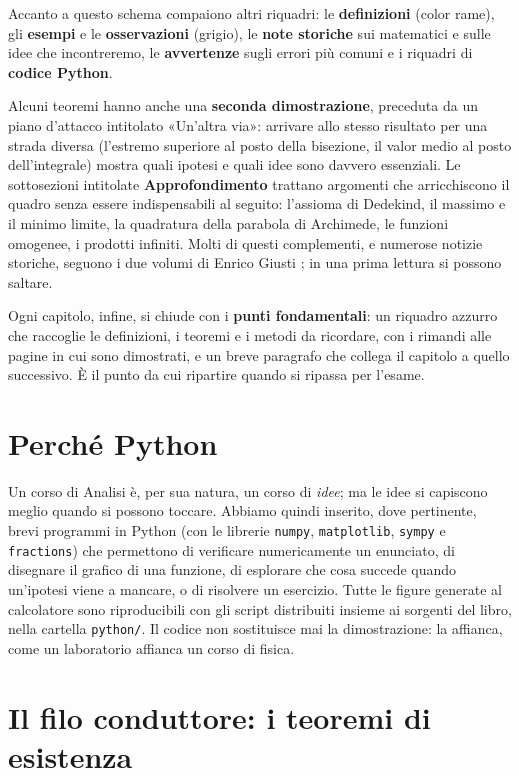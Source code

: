 Accanto a questo schema compaiono altri riquadri: le \textbf{definizioni} (color rame),
gli \textbf{esempi} e le \textbf{osservazioni} (grigio), le \textbf{note storiche} sui
matematici e sulle idee che incontreremo, le \textbf{avvertenze} sugli errori più comuni
e i riquadri di \textbf{codice Python}.

Alcuni teoremi hanno anche una \textbf{seconda dimostrazione}, preceduta da un piano
d'attacco intitolato «Un'altra via»: arrivare allo stesso risultato per una strada
diversa (l'estremo superiore al posto della bisezione, il valor medio al posto
dell'integrale) mostra quali ipotesi e quali idee sono davvero essenziali. Le
sottosezioni intitolate \textbf{Approfondimento} trattano argomenti che arricchiscono
il quadro senza essere indispensabili al seguito: l'assioma di Dedekind, il massimo e il
minimo limite, la quadratura della parabola di Archimede, le funzioni omogenee, i
prodotti infiniti. Molti di questi complementi, e numerose notizie storiche, seguono i
due volumi di Enrico Giusti \cite{giusti,giusti2}; in una prima lettura si possono
saltare.

Ogni capitolo, infine, si chiude con i
\textbf{punti fondamentali}: un riquadro azzurro che raccoglie le definizioni, i teoremi
e i metodi da ricordare, con i rimandi alle pagine in cui sono dimostrati, e un breve
paragrafo che collega il capitolo a quello successivo. È il punto da cui ripartire
quando si ripassa per l'esame.

\section*{Perché Python}

Un corso di Analisi è, per sua natura, un corso di \emph{idee}; ma le idee si capiscono
meglio quando si possono toccare. Abbiamo quindi inserito, dove pertinente, brevi
programmi in Python (con le librerie \texttt{numpy}, \texttt{matplotlib},
\texttt{sympy} e \texttt{fractions}) che permettono di verificare numericamente un
enunciato, di disegnare il grafico di una funzione, di esplorare che cosa succede quando
un'ipotesi viene a mancare, o di risolvere un esercizio. Tutte le figure generate al
calcolatore sono riproducibili con gli script distribuiti insieme ai sorgenti del libro,
nella cartella \texttt{python/}. Il codice non sostituisce mai la dimostrazione: la
affianca, come un laboratorio affianca un corso di fisica.

\section*{Il filo conduttore: i teoremi di esistenza}

